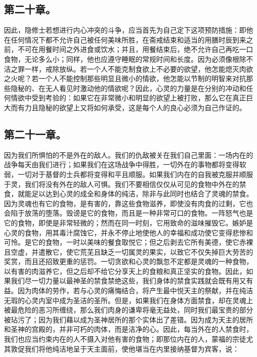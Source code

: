 
\subsection{第二十章。}

\par

因此，隐修士若想进行内心冲突的斗争，应当首先为自己定下这项预防措施：即他在任何情况下都不允许自己被任何美味所胜，在斋戒结束和适当的用膳时辰到来之前，不可在用餐时间之外进食或饮水；并且，用餐结束后，绝不允许自己再吃一口食物，无论多么小；同样，他也应遵守睡眠的常规时间和长度。因为必须像根除不洁之罪一样，戒除放纵。若一个人不能克制食欲上不必要的欲望，他怎能熄灭肉欲之火呢？若一个人不能控制那些明显且微小的情欲，他怎能以节制的明智来对抗那些隐秘的、在无人看见时激动他的情欲呢？因此，心灵的力量是在分别的冲动和任何情欲中受到考验的：如果它在非常微小和明显的欲望上被打败，那么它在真正巨大而有力且隐秘的欲望上又将如何承受，这是每个人的良心必须为自己作证的。\par


\subsection{第二十一章。}

\par

因为我们所惧怕的不是外在的敌人。我们的仇敌被关在我们自己里面：一场内在的战争每天由我们进行；如果我们在这场战争中得胜，一切外在的事物都将变得软弱，一切对于基督的士兵都将变得和平且顺服。如果我们内在的自我被克服并顺服于灵，我们将没有外在的敌人可惧。我们不要相信仅仅从可见的食物中外在的禁食，就能足以达到心灵的成全和身体的纯洁，除非与此同时也结合了灵魂的禁食。因为灵魂也有它的食物，是有害的，靠这些食物滋养，即使没有肉食的过剩，它也会陷于放荡的堕落。毁谤是它的食物，而且是一种非常可口的食物。一阵怒气也是它的食物，即使是非常轻微的；然而在同一时刻，它用致命的滋味摧毁它。嫉妒是心灵的食物，用其毒汁腐蚀它，并永不停止地使他人的幸福和成功使它变得悲惨和可怜。是它的食物，一时以美味的餐食取悦它；但之后剥去它所有美德，使它赤裸且空虚，并遣散它，使它荒芜且缺乏一切属灵的果实，以致它不仅失掉巨大劳苦的奖赏，而且还招致更重的惩罚。一切贪欲和心灵的飘忽不定都是灵魂的一种食物，以有害的肉滋养它，但之后却不给它分享天上的食粮和真正坚实的食物。因此，如果我们尽一切力量以最神圣的禁食禁绝这些，我们身体的禁食实践就会既有用又有益。因为肉体的劳作，若与心灵的痛悔结合，将产生最中悦天主的祭献，并在纯洁无瑕的心灵内室中成为圣洁的圣所。但是，如果我们在身体方面禁食，却在灵魂上被最危险的恶习所缠绕，那么我们肉身的谦卑将毫无益处，同时我们最宝贵的部分被玷污了；因为我们藉以成为圣神居所的那个实体出了差错。因为成为天主的居所和圣神的宫殿的，并非可朽的肉体，而是洁净的心。因此，每当外在的人禁食时，我们也应当约束内在的人不摄入对他有害的食物；即那位内在的人，蒙福的宗徒尤其敦促我们将他纯洁地呈于天主面前，使他堪当在内里接纳基督为宾客，说： \par

